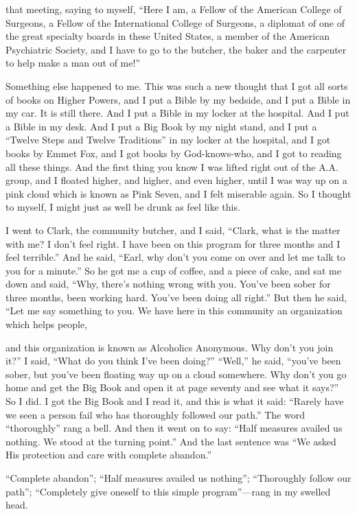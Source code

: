 that meeting, saying to myself, “Here I am, a Fellow of the American College of Surgeons, a Fellow of the International College of Surgeons, a diplomat of one of the great specialty boards in these United States, a member of the American Psychiatric Society, and I have to go to the butcher, the baker and the carpenter to help make a man out of me!”

Something else happened to me. This was such a new thought that I got all sorts of books on Higher Powers, and I put a Bible by my bedside, and I put a Bible in my car. It is still there. And I put a Bible in my locker at the hospital. And I put a Bible in my desk. And I put a Big Book by my night stand, and I put a “Twelve Steps and Twelve Traditions” in my locker at the hospital, and I got books by Emmet Fox, and I got books by God-knows-who, and I got to reading all these things. And the first thing you know I was lifted right out of the A.A. group, and I floated higher, and higher, and even higher, until I was way up on a pink cloud which is known as Pink Seven, and I felt miserable again. So I thought to myself, I might just as well be drunk as feel like this.

I went to Clark, the community butcher, and I said, “Clark, what is the matter with me? I don’t feel right. I have been on this program for three months and I feel terrible.” And he said, “Earl, why don’t you come on over and let me talk to you for a minute.” So he got me a cup of coffee, and a piece of cake, and sat me down and said, “Why, there’s nothing wrong with you. You’ve been sober for three months, been working hard. You’ve been doing all right.” But then he said, “Let me say something to you. We have here in this community an organization which helps people,

and this organization is known as Alcoholics Anonymous. Why don’t you join it?” I said, “What do you think I’ve been doing?” “Well,” he said, “you’ve been sober, but you’ve been floating way up on a cloud somewhere. Why don’t you go home and get the Big Book and open it at page seventy and see what it says?” So I did. I got the Big Book and I read it, and this is what it said: “Rarely have we seen a person fail who has thoroughly followed our path.” The word “thoroughly” rang a bell. And then it went on to say: “Half measures availed us nothing. We stood at the turning point.” And the last sentence was “We asked His protection and care with complete abandon.”

“Complete abandon”; “Half measures availed us nothing”; “Thoroughly follow our path”; “Completely give oneself to this simple program”—rang in my swelled head.

